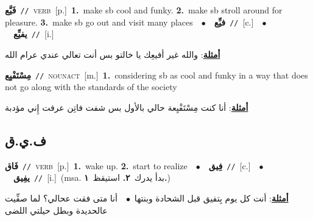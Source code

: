 \documentclass[10pt,a4paper,twoside]{article} %
\begin{document}
\begin{multicols}{2}
{\setlength\topsep{0pt}\textbf{\foreignlanguage{arabic}{فَيَّع}}\ {\color{gray}\texttt{//}\color{black}}\ \textsc{verb}\ [p.]\ \textbf{1.}~make sb cool and funky.  \textbf{2.}~make sb stroll around for pleasure.  \textbf{3.}~make sb go out and visit many places\ \ $\bullet$\ \ \setlength\topsep{0pt}\textbf{\foreignlanguage{arabic}{فيِّع}}\ {\color{gray}\texttt{//}\color{black}}\ [c.]\ \ $\bullet$\ \ \setlength\topsep{0pt}\textbf{\foreignlanguage{arabic}{يفيِّع}}\ {\color{gray}\texttt{//}\color{black}}\ [i.]\  \begin{flushright}\color{gray}\foreignlanguage{arabic}{\textbf{\underline{\foreignlanguage{arabic}{أمثلة}}}: والله غير أفيعِك يا خالتو بس أنت تعالي عندي عرام الله}\end{flushright}\color{black}} \vspace{2mm}

{\setlength\topsep{0pt}\textbf{\foreignlanguage{arabic}{مِسْتَفْيِع}}\ {\color{gray}\texttt{//}\color{black}}\ \textsc{noun\textunderscore act}\ [m.]\ \textbf{1.}~considering sb as cool and funky in a way that does not go along with the standards of the society\  \begin{flushright}\color{gray}\foreignlanguage{arabic}{\textbf{\underline{\foreignlanguage{arabic}{أمثلة}}}: أنا كنت مِسْتَفْيِعة حالي بالأول بس شفت فاتِن عرفت إِني مؤدبة}\end{flushright}\color{black}} \vspace{2mm}

\vspace{-3mm}
\subsection*{\color{blue}\foreignlanguage{arabic}{ف.ي.ق}\color{blue}{}} 

{\setlength\topsep{0pt}\textbf{\foreignlanguage{arabic}{فَاق}}\ {\color{gray}\texttt{//}\color{black}}\ \textsc{verb}\ [p.]\ \textbf{1.}~wake up.  \textbf{2.}~start to realize\ \ $\bullet$\ \ \setlength\topsep{0pt}\textbf{\foreignlanguage{arabic}{فِيق}}\ {\color{gray}\texttt{//}\color{black}}\ [c.]\ \ $\bullet$\ \ \setlength\topsep{0pt}\textbf{\foreignlanguage{arabic}{يفِيق}}\ {\color{gray}\texttt{//}\color{black}}\ [i.]\ \color{gray}(msa. \foreignlanguage{arabic}{بدأ يدرك}~\foreignlanguage{arabic}{\textbf{٢.}}  \foreignlanguage{arabic}{استيقظ}~\foreignlanguage{arabic}{\textbf{١.}})\color{black}\  \begin{flushright}\color{gray}\foreignlanguage{arabic}{\textbf{\underline{\foreignlanguage{arabic}{أمثلة}}}: أنت كل يوم بِتفيق قبل الشحادة وبنتها\ $\bullet$\ \  أنا متى فقت عحالي؟ لما صفِّيت عالحديدة وبطل حيلتي اللضى}\end{flushright}\color{black}} \vspace{2mm}


\end{multicols}
\end{document}
